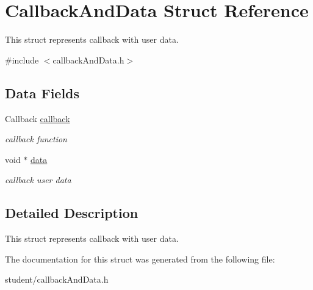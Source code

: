 \hypertarget{structCallbackAndData}{}\section{Callback\+And\+Data Struct Reference}
\label{structCallbackAndData}


This struct represents callback with user data.  




{\ttfamily \#include $<$callback\+And\+Data.\+h$>$}

\subsection*{Data Fields}
\begin{DoxyCompactItemize}
\item 
\mbox{\label{structCallbackAndData_ad476378cedbec0eb6d0f94230f748985}} 
Callback \hyperlink{structCallbackAndData_ad476378cedbec0eb6d0f94230f748985}{callback}
\begin{DoxyCompactList}\small\item\em callback function \end{DoxyCompactList}\item 
\mbox{\label{structCallbackAndData_a78a20f2b84b041bc23a8933a8078cb92}} 
void $\ast$ \hyperlink{structCallbackAndData_a78a20f2b84b041bc23a8933a8078cb92}{data}
\begin{DoxyCompactList}\small\item\em callback user data \end{DoxyCompactList}\end{DoxyCompactItemize}


\subsection{Detailed Description}
This struct represents callback with user data. 

The documentation for this struct was generated from the following file\+:\begin{DoxyCompactItemize}
\item 
student/callback\+And\+Data.\+h\end{DoxyCompactItemize}

